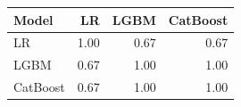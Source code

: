 \begin{tabular}{@{}lrrr@{}}
\toprule
Model & LR & LGBM & CatBoost \\
\midrule
LR & 1.00 & 0.67 & 0.67 \\
LGBM & 0.67 & 1.00 & 1.00 \\
CatBoost & 0.67 & 1.00 & 1.00 \\
\bottomrule
\end{tabular}
